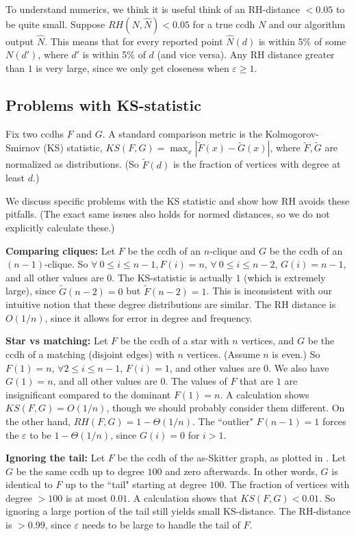 \documentclass[11pt]{article}
\theoremstyle{definition}
\def\eps{\varepsilon}
\newcommand{\tF}{\widetilde{F}}
\newcommand{\tG}{\widetilde{G}}
\newcommand{\hN}{\widehat{N}}
\begin{document}
To understand numerics, we think it is useful think of an RH-distance $< 0.05$ to be quite small.
Suppose $RH(N,\hN) < 0.05$ for a true ccdh $N$ and our algorithm output $\hN$. This means that
for every reported point $\hN(d)$ is within 5\% of some $N(d')$, where $d'$ is within 5\% of $d$
(and vice versa). Any RH distance greater than $1$ is very large, since we only get closeness
when $\eps \geq 1$.

\subsection{Problems with KS-statistic}

Fix two ccdhs $F$ and $G$. A standard comparison metric is the Kolmogorov-Smirnov (KS) statistic, $KS(F,G) = \max_x |\tF(x) - \tG(x)|$,
where $\tF, \tG$ are normalized as distributions. (So $\tF(d)$ is the fraction of vertices
with degree at least $d$.)

We discuss specific problems with the KS statistic and show how RH avoids these pitfalls.
(The exact same issues also holds for normed distances, so we do not explicitly calculate these.)

\textbf{Comparing cliques:} Let $F$ be the ccdh of an $n$-clique and $G$ be the ccdh of an $(n-1)$-clique.
So $\forall \ 0 \leq i \leq n-1, F(i) = n$, $\forall \ 0 \leq i \leq n-2$, $G(i) = n-1$, and all other values are $0$.
The KS-statistic is actually $1$ (which is extremely large), since $\tG(n-2) = 0$ but $\tF(n-2) = 1$.
This is inconsistent with our intuitive notion that these degree distributions are similar.
The RH distance is $O(1/n)$, since it allows for error in degree and frequency.

\textbf{Star vs matching:} Let $F$ be the ccdh of a star with $n$ vertices, and $G$
be the ccdh of a matching (disjoint edges) with $n$ vertices. (Assume $n$ is even.)
So $F(1) = n$, $\forall 2 \leq i \leq n-1$, $F(i) = 1$, and other values are $0$.
We also have $G(1) = n$, and all other values are $0$. The values of $F$ that are $1$
are insignificant compared to the dominant $F(1) = n$. A calculation shows $KS(F,G) = O(1/n)$,
though we should probably consider them different.
On the other hand, $RH(F,G) = 1 - \Theta(1/n)$. The ``outlier" $F(n-1)=1$ forces the $\eps$ to be $1-\Theta(1/n)$,
since $G(i) = 0$ for $i > 1$.

\textbf{Ignoring the tail:} Let $F$ be the ccdh of the as-Skitter graph, as plotted in .
Let $G$ be the same ccdh up to degree $100$ and zero afterwards. In other words, $G$ is identical to $F$
up to the ``tail" starting at degree $100$. The fraction of vertices with degree $> 100$ is at most $0.01$.
A calculation shows that $KS(F,G) < 0.01$. So ignoring a large portion of the tail still yields
small KS-distance. The RH-distance is $>0.99$, since $\eps$ needs to be large to handle
the tail of $F$.
\end{document}
